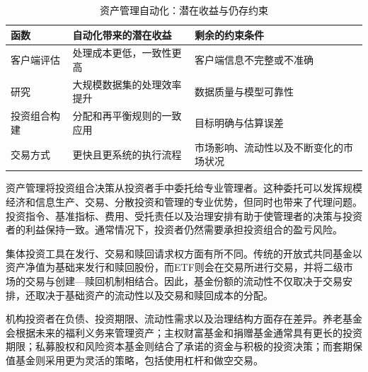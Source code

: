 \begin{table}[H]

\centering

\caption{资产管理自动化：潜在收益与仍存约束}

\label{tab:ch14-automation-asset-management}

\begin{tabularx}{0.94\textwidth}{@{}p{} X X@{}}

\toprule

\textbf{函数} & \textbf{自动化带来的潜在收益} & \textbf{剩余的约束条件} \\

\midrule

客户端评估  
& 处理成本更低，一致性更高  
& 客户端信息不完整或不准确  
\\

研究
& 大规模数据集的处理效率提升
& 数据质量与模型可靠性 \\

投资组合构建
& 分配和再平衡规则的一致应用
& 目标明确与估算误差 \\

交易方式  
& 更快且更系统的执行流程  
& 市场影响、流动性以及不断变化的市场状况  
\\

\bottomrule

\end{tabularx}

\end{table}



资产管理将投资组合决策从投资者手中委托给专业管理者。这种委托可以发挥规模经济和信息生产、交易、分散投资和管理的专业优势，但同时也带来了代理问题。投资指令、基准指标、费用、受托责任以及治理安排有助于使管理者的决策与投资者的利益保持一致。通常情况下，投资者仍然需要承担投资组合的盈亏风险。

集体投资工具在发行、交易和赎回请求权方面有所不同。传统的开放式共同基金以资产净值为基础来发行和赎回股份，而ETF则会在交易所进行交易，并将二级市场的交易与创建—赎回机制相结合。因此，基金份额的流动性不仅取决于交易安排，还取决于基础资产的流动性以及交易和赎回成本的分配。

机构投资者在负债、投资期限、流动性需求以及治理结构方面存在差异。养老基金会根据未来的福利义务来管理资产；主权财富基金和捐赠基金通常具有更长的投资期限；私募股权和风险资本基金则结合了承诺的资金与积极的投资决策；而套期保值基金则采用更为灵活的策略，包括使用杠杆和做空交易。


